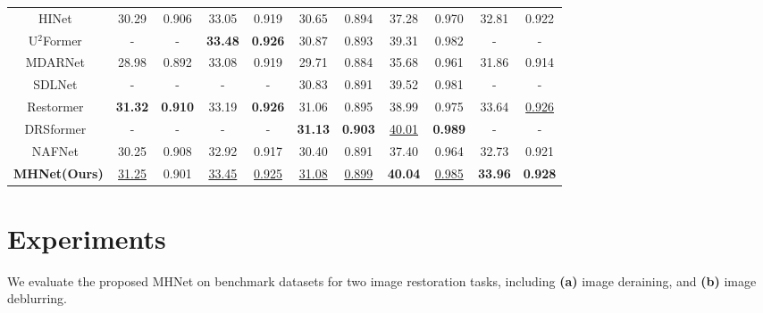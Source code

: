 \documentclass[lettersize,journal]{IEEEtran}
\begin{document}
\begin{table*}
\begin{tabular}{ccccccccc||cc}
      HINet~\cite{Chen_2021_CVPR}  & 30.29 & 0.906 & 33.05&  0.919   & 30.65 & 0.894 & 37.28 & 0.970 & 32.81  & 0.922
     \\
     U$^2$Former~\cite{u2former} & - & - & \textbf{33.48} & \textbf{0.926} & 30.87 & 0.893 & 39.31 & 0.982 & - &-
     \\
     MDARNet~\cite{MDARNet} & 28.98 & 0.892 & 33.08 & 0.919 & 29.71 & 0.884 & 35.68 & 0.961 & 31.86 &0.914
     \\
      SDLNet~\cite{SDLNet} &- & - &- &- & 30.83 & 0.891 & 39.52 & 0.981 & - &-
     \\
     Restormer~\cite{Zamir2021Restormer} &\textbf{31.32} & \textbf{0.910} & 33.19 & \textbf{0.926} & 31.06 &0.895 &38.99 &0.975 &33.64 & \underline{0.926} 
     \\
     DRSformer~\cite{DRSformer} & - & - & - & - & \textbf{31.13} & \textbf{0.903} &\underline{40.01} & \textbf{0.989} & - & -
     \\
     \hline
      NAFNet~\cite{chen2022simple}  & 30.25 & 0.908 & 32.92 &  0.917   & 30.40 & 0.891  & 37.40 & 0.964 & 32.73  & 0.921
       \\
     \hline
      \textbf{MHNet(Ours)}  & \underline{31.25} & 0.901 & \underline{33.45} &  \underline{0.925}  &\underline{ 31.08} & \underline{0.899}  & \textbf{40.04} & \underline{0.985} & \textbf{33.96} & \textbf{0.928}
    \\
    \hline
\end{tabular}
\end{table*}




\section{Experiments}
We evaluate the proposed MHNet on benchmark datasets  for two image restoration tasks, including \textbf{(a)} image deraining, and \textbf{(b)} image deblurring.
\end{document}
